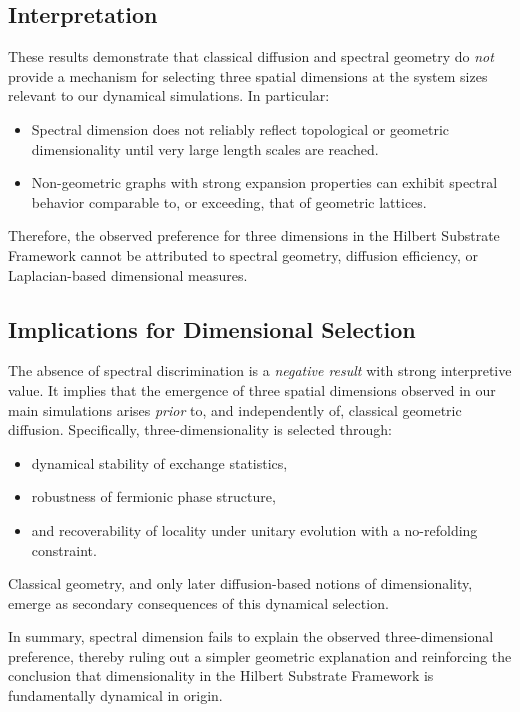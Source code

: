 \subsection{Interpretation}

These results demonstrate that classical diffusion and spectral geometry do \emph{not} provide a mechanism for selecting three spatial dimensions at the system sizes relevant to our dynamical simulations. In particular:
\begin{itemize}
\item Spectral dimension does not reliably reflect topological or geometric dimensionality until very large length scales are reached.
\item Non-geometric graphs with strong expansion properties can exhibit spectral behavior comparable to, or exceeding, that of geometric lattices.
\end{itemize}

Therefore, the observed preference for three dimensions in the Hilbert Substrate Framework cannot be attributed to spectral geometry, diffusion efficiency, or Laplacian-based dimensional measures.

\subsection{Implications for Dimensional Selection}

The absence of spectral discrimination is a \emph{negative result} with strong interpretive value. It implies that the emergence of three spatial dimensions observed in our main simulations arises \emph{prior} to, and independently of, classical geometric diffusion. Specifically, three-dimensionality is selected through:
\begin{itemize}
\item dynamical stability of exchange statistics,
\item robustness of fermionic phase structure,
\item and recoverability of locality under unitary evolution with a no-refolding constraint.
\end{itemize}

Classical geometry, and only later diffusion-based notions of dimensionality, emerge as secondary consequences of this dynamical selection.

In summary, spectral dimension fails to explain the observed three-dimensional preference, thereby ruling out a simpler geometric explanation and reinforcing the conclusion that dimensionality in the Hilbert Substrate Framework is fundamentally dynamical in origin.
